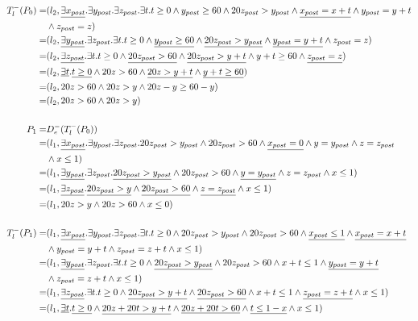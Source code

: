 
\begin{align*}
T_l^-(P_0)=&(l_2,\underline{\exists\xp}.\exists\yp.\exists\zp.\exists t.t\ge 0\wedge\yp\ge 60\wedge 20\zp>\yp\wedge\underline{\xp=x+t}\wedge\yp=y+t\\&\wedge\zp=z) \\
=&(l_2,\underline{\exists\yp}.\exists\zp.\exists t.t\ge 0\wedge\underline{\yp\ge 60}\wedge \underline{20\zp>\yp}\wedge\underline{\yp=y+t}\wedge\zp=z) \\
=&(l_2,\underline{\exists\zp}.\exists t.t\ge 0\wedge \underline{20\zp>60}\wedge\underline{20\zp>y+t}\wedge y+t\ge 60\wedge\underline{\zp=z}) \\
=&(l_2,\underline{\exists t}.\underline{t\ge 0}\wedge 20z>60\wedge\underline{20z>y+t}\wedge \underline{y+t\ge 60}) \\
=&(l_2,20z>60\wedge 20z>y\wedge 20z -y\ge 60 -y) \\
=&(l_2,20z>60\wedge 20z>y) \\
\\
P_1=&D_e^-(T_l^-(P_0))\\
=&(l_1,\underline{\exists\xp}.\exists\yp.\exists\zp.20\zp >\yp\wedge 20\zp>60\wedge\underline{\xp=0}\wedge y=\yp\wedge z=\zp\\&\wedge x\le 1) \\
=&(l_1,\underline{\exists\yp}.\exists\zp.\underline{20\zp >\yp}\wedge 20\zp>60\wedge\underline{y=\yp}\wedge z=\zp \wedge x\le 1) \\
=&(l_1,\underline{\exists\zp}.\underline{20\zp >y}\wedge \underline{20\zp>60}\wedge \underline{z=\zp} \wedge x\le 1) \\
=&(l_1,20z >y\wedge 20z>60\wedge x\le 0) \\
\\
T_l^-(P_1)=&(l_1,\underline{\exists\xp}.\exists\yp.\exists\zp.\exists t.t\ge 0\wedge 20\zp >\yp\wedge 20\zp>60\wedge\underline{\xp\le 1}\wedge\underline{\xp=x+t}\\&\wedge\yp=y+t\wedge\zp=z+t\wedge x\le 1)\\
=&(l_1,\underline{\exists\yp}.\exists\zp.\exists t.t\ge 0\wedge\underline{20\zp >\yp}\wedge 20\zp>60\wedge x+t\le 1\wedge\underline{\yp=y+t}\\&\wedge\zp=z+t\wedge x\le 1)\\
=&(l_1,\underline{\exists\zp}.\exists t.t\ge 0\wedge\underline{20\zp >y+t}\wedge \underline{20\zp>60}\wedge x+t\le 1\wedge\underline{\zp=z+t}\wedge x\le 1)\\
=&(l_1,\underline{\exists t}.\underline{t\ge 0}\wedge\underline{20z+20t >y+t}\wedge \underline{20z+20t>60}\wedge \underline{t\le 1-x}\wedge x\le 1)\\

\end{align*}
